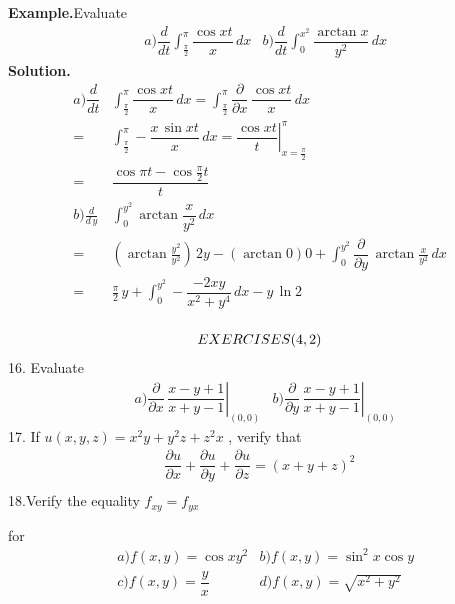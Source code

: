 \documentclass{article}
\begin{document}
 
\textbf{Example.}Evaluate
\begin{align*}
	&a) \dfrac{d}{dt} \int_{\frac{\pi}{2}}^{\pi}  \dfrac{\cos xt}{x} \, dx & b) \dfrac{d}{dt} \int_{0}^{x^{2}}  \dfrac{\arctan x}{y^{2}} \, dx
\end{align*}
\textbf{Solution.}
\begin{align*}
	a) \dfrac{d}{dt} &\int_{\frac{\pi}{2}}^{\pi}  \dfrac{\cos xt}{x} \, dx = \int_{\frac{\pi}{2}}^{\pi}  \dfrac{\partial }{\partial x} \, \dfrac{\cos xt}{x} \, dx \\
	=&\int_{\frac{\pi}{2}}^{\pi}  -\dfrac{x \,\sin xt}{x} \, dx  = \left. \dfrac{\cos xt}{t} \right|_{x=\frac{\pi}{2}}^\pi \\
	=&\dfrac{\cos \pi t - \cos \frac{\pi}{2} t}{t}	\\
	b)\frac{d}{d \, y} & \int_{0}^{y^{2}} \arctan \dfrac{x}{y^{2}} \, dx \\
	=&(\arctan \frac{y^{2}}{y^{2}}  ) \, 2y  - (\arctan 0)0  +\int_{0}^{y^{2}}   \dfrac{\partial }{\partial y} \,  \arctan\frac{x}{y^{2}} \, dx \\
	=&\frac{\pi}{2} \, y + \int_{0}^{y^{2}} -\dfrac{-2xy}{x^{2}+y^{4}} \, dx  -y \, \ln2 \\
\end{align*}

\begin{align*}
\centering
 EXERCISES(4,2) 
\end{align*}
16. Evaluate \\
\begin{align*}
	&a)  \left. \dfrac{\partial}{\partial x} \,  \dfrac{x-y+1}{x+y-1}\right|_{(0,0)}  &b) \left.  \dfrac{\partial}{\partial y} \,  \dfrac{x-y+1}{x+y-1}\right|_{(0,0)} 
	\end{align*}
17. If
$ u(x,y,z)=x^{2}y+y^{2}z+z^{2}x
$
, verify  that  \\
\begin{align*}
\dfrac{\partial u}{\partial x} + \dfrac{\partial u}{\partial y} + \dfrac{\partial u}{\partial z} =(x+y+z)^2 \\
\end{align*}
18.Verify the equality 
$f_{xy}=f_{yx}
$

for\\
\begin{align*}
&a)f(x,y)= \cos x y^{2} & b)f(x,y)=\sin^{2}x \cos y \\
&c)f(x,y)= {\dfrac{y}{x}} & d)f(x,y)= \sqrt{x^{2}+y^{2}} \\
\end{align*}	
	
\end{document}
